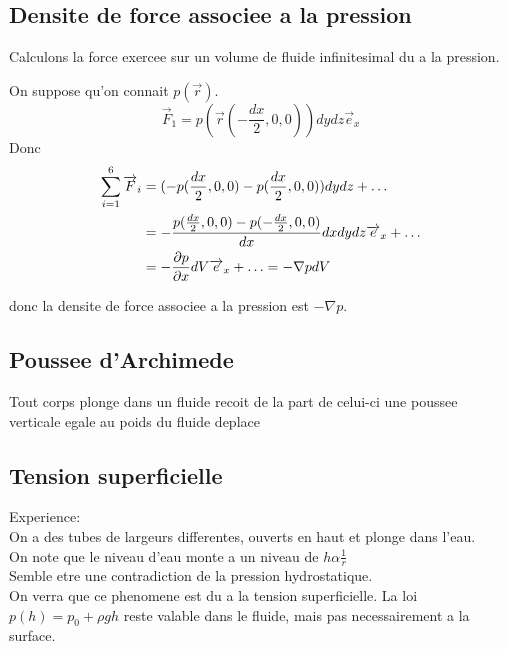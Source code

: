 \documentclass[../main.tex]{subfiles}
\begin{document}
\subsection{Densite de force associee a la pression}
Calculons la force exercee sur un volume de fluide infinitesimal du a la pression.\\
\begin{figure}[H]
    \centering
\end{figure}
On suppose qu'on connait $p( \vec{r}) $.
\[ 
	\vec{F}_1=p( \vec{r}( - \frac{dx}{2},0,0) )  dy dz \vec{e}_x
\]
Donc
\begin{align*}
	\sum_{i=1}^{ 6}\overrightarrow{F}_i &= ( -p( \frac{dx}{2},0,0) - p(  \frac{dx}{2},0,0) )  dy dz + \ldots\\
				 &= - \frac{p( \frac{dx}{2},0,0) - p( - \frac{dx}{2},0,0) }{dx}dx dy dz \overrightarrow{e}_x + \ldots \\
				 &= - \frac{\partial p}{\partial x} dV \overrightarrow{e}_x + \ldots = - \nabla p dV
\end{align*}

donc la densite de force associee a la pression est $-\nabla p$.
\subsection{Poussee d'Archimede}
Tout corps plonge dans un fluide recoit de la part de celui-ci une poussee verticale egale au poids du fluide deplace
\subsection{Tension superficielle}
Experience:\\
On a des tubes de largeurs differentes, ouverts en haut et plonge dans l'eau.\\
On note que le niveau d'eau monte a un niveau de $h \alpha \frac{1}{r}$ \\
Semble etre une contradiction de la pression hydrostatique.\\
On verra que ce phenomene est du a la tension superficielle.
La loi $p( h) = p_0 + \rho g h$ reste valable dans le fluide, mais pas necessairement a la surface.
\end{document}
